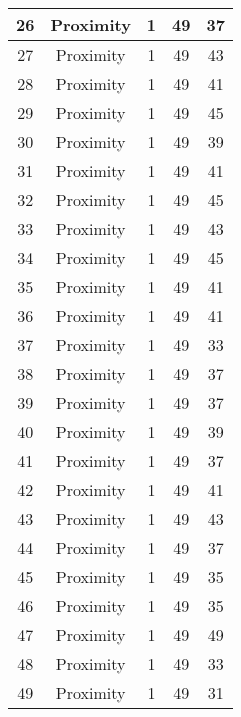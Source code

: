\documentclass[results.tex]{subfiles}
\begin{document}
\begin{center}
\begin{tabular}{| c || c | c | c | c |}
    \hline
    26 & Proximity & 1 & 49 & 37 \\ 
    \hline
    27 & Proximity & 1 & 49 & 43 \\ 
    \hline
    28 & Proximity & 1 & 49 & 41 \\ 
    \hline
    29 & Proximity & 1 & 49 & 45 \\ 
    \hline
    30 & Proximity & 1 & 49 & 39 \\ 
    \hline
    31 & Proximity & 1 & 49 & 41 \\ 
    \hline
    32 & Proximity & 1 & 49 & 45 \\ 
    \hline
    33 & Proximity & 1 & 49 & 43 \\ 
    \hline
    34 & Proximity & 1 & 49 & 45 \\ 
    \hline
    35 & Proximity & 1 & 49 & 41 \\ 
    \hline
    36 & Proximity & 1 & 49 & 41 \\ 
    \hline
    37 & Proximity & 1 & 49 & 33 \\ 
    \hline
    38 & Proximity & 1 & 49 & 37 \\ 
    \hline
    39 & Proximity & 1 & 49 & 37 \\ 
    \hline
    40 & Proximity & 1 & 49 & 39 \\ 
    \hline
    41 & Proximity & 1 & 49 & 37 \\ 
    \hline
    42 & Proximity & 1 & 49 & 41 \\ 
    \hline
    43 & Proximity & 1 & 49 & 43 \\ 
    \hline
    44 & Proximity & 1 & 49 & 37 \\ 
    \hline
    45 & Proximity & 1 & 49 & 35 \\ 
    \hline
    46 & Proximity & 1 & 49 & 35 \\ 
    \hline
    47 & Proximity & 1 & 49 & 49 \\ 
    \hline
    48 & Proximity & 1 & 49 & 33 \\ 
    \hline
    49 & Proximity & 1 & 49 & 31 \\ 
    \hline   \end{tabular}
\end{center}
\end{document}
